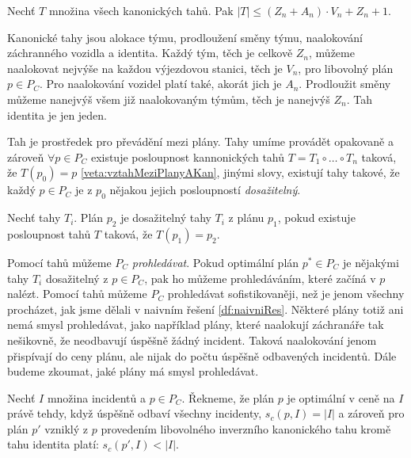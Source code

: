 \begin{veta}\label{veta:pocetKanTahu}
  Nechť $T$ množina všech kanonických tahů. Pak $|T| \leq (Z_n + A_n) \cdot V_n + Z_n + 1$.
\end{veta}
\begin{dukaz}
  Kanonické tahy jsou alokace týmu, prodloužení směny týmu, naalokování záchranného vozidla a identita.
  Každý tým, těch je celkově $Z_n$, můžeme naalokovat nejvýše na každou výjezdovou stanici, těch je $V_n$, pro libovolný plán $p \in P_C$.
  Pro naalokování vozidel platí také, akorát jich je $A_n$.
  Prodloužit směny můžeme nanejvýš všem již naalokovaným týmům, těch je nanejvýš $Z_n$.
  Tah identita je jen jeden.
\end{dukaz}

Tah je prostředek pro převádění mezi plány.
Tahy umíme provádět opakovaně a zároveň $\forall p \in P_C$ existuje posloupnost kannonických tahů $T = T_1 \circ \dots \circ T_n$ taková, že $T(p_0) = p$ \ref{veta:vztahMeziPlanyAKan},
jinými slovy, existují tahy takové, že každý $p \in P_C$ je z $p_0$ nějakou jejich posloupností \textit{dosažitelný}.

\begin{definice}
  Nechť tahy $T_i$.
  Plán $p_2$ je dosažitelný tahy $T_i$ z plánu $p_1$, pokud existuje posloupnost tahů $T$ taková, že $T(p_1) = p_2$.
\end{definice}

Pomocí tahů můžeme $P_C$ \textit{prohledávat}.
Pokud optimální plán $p^* \in P_C$ je nějakými tahy $T_i$ dosažitelný z $p \in P_C$, pak ho můžeme prohledáváním, které začíná v $p$ nalézt.
Pomocí tahů můžeme $P_C$ prohledávat sofistikovaněji, než je jenom všechny procházet, jak jsme dělali v naivním řešení \ref{df:naivniRes}.
Některé plány totiž ani nemá smysl prohledávat, jako například plány, které naalokují záchranáře tak nešikovně, že neodbavují úspěšně žádný incident.
Taková naalokování jenom přispívají do ceny plánu, ale nijak do počtu úspěšně odbavených incidentů.
Dále budeme zkoumat, jaké plány má smysl prohledávat.

\begin{definice}\label{veta:planOptVCene}
  Nechť $I$ množina incidentů a $p \in P_C$.
  Řekneme, že plán $p$ je optimální v ceně na $I$ právě tehdy, když úspěšně odbaví všechny incidenty, $s_c(p, I) = |I|$ a zároveň
  pro plán $p'$ vzniklý z $p$ provedením libovolného inverzního kanonického tahu kromě tahu identita platí: $s_c(p', I) < |I|$.
\end{definice}

